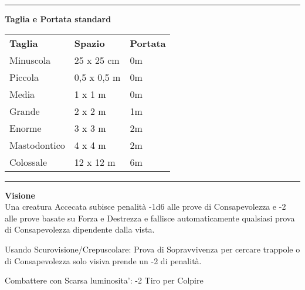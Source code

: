 \documentclass[a4paper,12 pt,openany]{book}
\newcommand{\riga}{\rule{\textwidth}{0.4pt}}
\begin{document}
\begin{textblock*}{8.3cm}
\riga

\textbf{Taglia e Portata standard}\\
\begin{tabular}{lll}
\textbf{Taglia}& \textbf{Spazio} &\textbf{Portata}\\
Minuscola & 25 x 25 cm&0m\\
Piccola & 0,5 x 0,5 m &0m\\
Media & 1 x 1 m & 0m\\
Grande & 2 x 2 m& 1m\\
Enorme & 3 x 3 m &2m\\
Mastodontico & 4 x 4 m&2m\\
Colossale & 12 x 12 m&6m\\
\end{tabular}

\riga

\textbf{Visione}\\

Una creatura Accecata subisce penalità -1d6 alle prove di Consapevolezza e -2 alle prove basate su Forza e Destrezza e fallisce automaticamente qualsiasi prova di Consapevolezza dipendente dalla vista.

Usando Scurovisione/Crepuscolare: Prova di Sopravvivenza per cercare trappole o di Consapevolezza solo visiva prende un -2 di penalità.

Combattere con Scarsa luminosita': -2 Tiro per Colpire


\end{textblock*}
\end{document}
